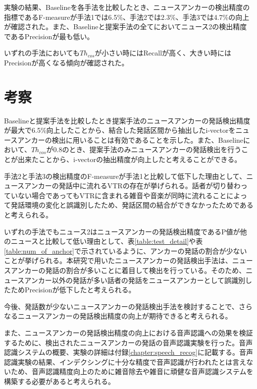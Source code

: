実験の結果、Baselineを各手法を比較したとき、ニュースアンカーの検出精度の指標であるF-measureが手法1では6.5\%、手法2では2.3\%、手法3では4.7\%の向上が確認された。また、Baselineと提案手法の全てにおいてニュース2の検出精度であるPrecisionが最も低い。\par
いずれの手法においても$Th_{cos}$が小さい時にはRecallが高く、大きい時にはPrecisionが高くなる傾向が確認された。\par

\section{考察}
Baselineと提案手法を比較したとき提案手法のニュースアンカーの発話検出精度が最大で6.5\%向上したことから、結合した発話区間から抽出したi-vectorをニュースアンカーの検出に用いることは有効であることを示した。また、Baselineにおいて、$Th_{cos}$が0.8のとき、提案手法のみニュースアンカーの発話検出を行うことが出来たことから、i-vectorの抽出精度が向上したと考えることができる。\par
手法2と手法3の検出精度のF-measureが手法1と比較して低下した理由として、ニュースアンカーの発話中に流れるVTRの存在が挙げられる。話者が切り替わっていない場合であってもVTRに含まれる雑音や音楽が同時に流れることによって発話環境の変化と誤識別したため、発話区間の結合ができなかったためであると考えられる。\par
いずれの手法でもニュース2はニュースアンカーの発話検出精度であるP値が他のニュースと比較して低い理由として、表\ref{table:test_detail}や表\ref{table:num_of_anchor}で示されているように、アンカーの発話の割合が少ないことが挙げられる。本研究で用いたニュースアンカーの発話検出手法\cite{nozaki_gakuseikai}は、ニュースアンカーの発話の割合が多いことに着目して検出を行っている。そのため、ニュースアンカー以外の発話が多い話者の発話をニュースアンカーとして誤識別したためPrecisionが低下したと考えられる。\par
今後、発話数が少ないニュースアンカーの発話検出手法を検討することで、さらなるニュースアンカーの発話検出精度の向上が期待できると考えられる。\par
また、ニュースアンカーの発話検出精度の向上における音声認識への効果を検証するために、検出されたニュースアンカーの発話の音声認識実験を行った。音声認識システムの概要、実験の詳細は付録\ref{chapter:speech_recog}に記載する。音声認識実験の結果、インデクシングに十分な精度で音声認識が行われたとは言えないため、音声認識精度向上のために雑音除去や雑音に頑健な音声認識システムを構築する必要があると考えられる。
